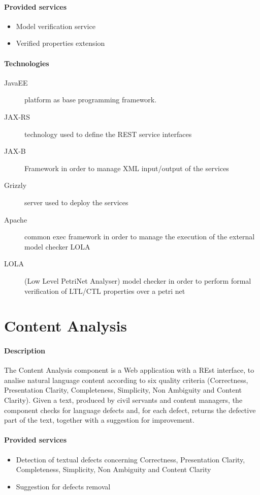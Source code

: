 \documentclass{learnpad}
\begin{document}
\paragraph{Provided services}
\begin{itemize}
	\item Model verification service 
	\item Verified properties extension
\end{itemize}

\paragraph{Technologies}
\begin{description}
	\item[JavaEE] platform as base programming framework.
	\item[JAX-RS] technology used to define the REST service interfaces
	\item[JAX-B] Framework in order to manage XML input/output of the services
	\item[Grizzly] server used to deploy the services
	\item[Apache] common exec framework in order to manage the execution of the external model checker LOLA
	\item[LOLA] (Low Level PetriNet Analyser) model checker in order to perform formal verification of LTL/CTL properties over a petri net
\end{description}

\section{Content Analysis}\label{sec:content-analysis}
\paragraph{Description}
The Content Analysis component is a Web application with a REst interface, to
analise natural language content according to six quality criteria (Correctness,
Presentation Clarity, Completeness, Simplicity, Non Ambiguity and Content
Clarity). Given a text, produced by civil servants and content managers, the
component checks for language defects and, for each defect, returns the
defective part of the text, together with a suggestion for improvement.

\paragraph{Provided services}
\begin{itemize}
	\item Detection of textual defects concerning Correctness, Presentation Clarity, Completeness, Simplicity, Non Ambiguity and Content Clarity
	\item Suggestion for defects removal
\end{itemize}
\end{document}
